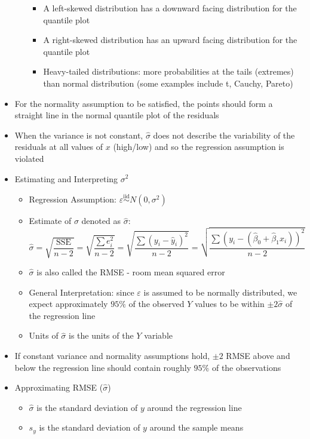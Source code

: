 \documentclass[12pt]{article}
\begin{document}
\begin{itemize}
\begin{itemize}
\begin{itemize}
\item A left-skewed distribution has a downward facing distribution for the quantile plot 
\item A right-skewed distribution has an upward facing distribution for the quantile plot 
\item Heavy-tailed distributions: more probabilities at the tails (extremes) than normal distribution (some examples include t, Cauchy, Pareto) \end{itemize} \end{itemize} 
\item For the normality assumption to be satisfied, the points should form a straight line in the normal quantile plot of the residuals 
\item When the variance is not constant, $\hat{\sigma}$ does not describe the variability of the residuals at all values of $x$ (high/low) and so the regression assumption is violated 
\item Estimating and Interpreting $\sigma^2$ \begin{itemize} 
\item Regression Assumption: $\varepsilon \stackrel{\text{iid}}{\sim} N(0, \sigma^2)$ 
\item Estimate of $\sigma$ denoted as $\hat{\sigma}$: 
$$ \hat{\sigma} = \sqrt{\frac{\text{SSE}}{n-2}} = \sqrt{\frac{\sum e_i^2}{n-2}} = \sqrt{\frac{\sum (y_i - \hat{y}_i)^2}{n-2}} = \sqrt{\frac{\sum (y_i - (\hat{\beta}_0 + \hat{\beta}_1x_i))^2}{n-2}} $$ 
\item $\hat{\sigma}$ is also called the RMSE - room mean squared error 
\item General Interpretation: since $\varepsilon$ is assumed to be normally distributed, we expect approximately $95\%$ of the observed $Y$ values to be within $\pm 2\hat{\sigma}$ of the regression line 
\item Units of $\hat{\sigma}$ is the units of the $Y$ variable \end{itemize} 
\item If constant variance and normality assumptions hold, $\pm 2$ RMSE above and below the regression line should contain roughly $95\%$ of the observations 
\item Approximating RMSE ($\hat{\sigma}$) \begin{itemize} 
\item $\hat{\sigma}$ is the standard deviation of $y$ around the regression line 
\item $s_y$ is the standard deviation of $y$ around the sample means 

\end{itemize}
\end{itemize}
\end{document}
